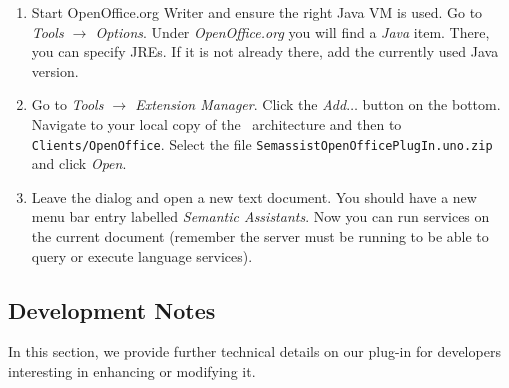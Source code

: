 \begin{enumerate}

  \item Start OpenOffice.org Writer and ensure the right Java VM is
  used. Go to \emph{Tools $\rightarrow$ Options}. Under
  \emph{OpenOffice.org} you will find a \emph{Java} item. There, you
  can specify JREs. If it is not already there, add the currently used
  Java version.
  
  \item Go to \emph{Tools $\rightarrow$ Extension Manager}. Click the
    \emph{Add$\ldots$} button on the bottom. Navigate to your local
    copy of the \sa\ architecture and then to
    \texttt{Clients/OpenOffice}. Select the file
    \texttt{SemassistOpenOfficePlugIn.uno.zip} and click \emph{Open}.

  \item Leave the dialog and open a new text document. You should have
    a new menu bar entry labelled \emph{Semantic Assistants}. Now you
    can run services on the current document (remember the server must
    be running to be able to query or execute language services).
\end{enumerate}


\subsection{Development Notes}
\label{sec:oo-spec}
In this section, we provide further technical details on our plug-in
for developers interesting in enhancing or modifying it.

